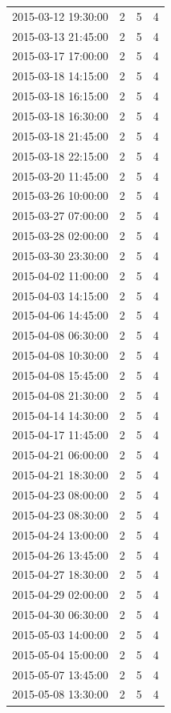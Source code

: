 \begin{tabular}{lrrr}
2015-03-12 19:30:00 & 2 & 5 & 4 \\
2015-03-13 21:45:00 & 2 & 5 & 4 \\
2015-03-17 17:00:00 & 2 & 5 & 4 \\
2015-03-18 14:15:00 & 2 & 5 & 4 \\
2015-03-18 16:15:00 & 2 & 5 & 4 \\
2015-03-18 16:30:00 & 2 & 5 & 4 \\
2015-03-18 21:45:00 & 2 & 5 & 4 \\
2015-03-18 22:15:00 & 2 & 5 & 4 \\
2015-03-20 11:45:00 & 2 & 5 & 4 \\
2015-03-26 10:00:00 & 2 & 5 & 4 \\
2015-03-27 07:00:00 & 2 & 5 & 4 \\
2015-03-28 02:00:00 & 2 & 5 & 4 \\
2015-03-30 23:30:00 & 2 & 5 & 4 \\
2015-04-02 11:00:00 & 2 & 5 & 4 \\
2015-04-03 14:15:00 & 2 & 5 & 4 \\
2015-04-06 14:45:00 & 2 & 5 & 4 \\
2015-04-08 06:30:00 & 2 & 5 & 4 \\
2015-04-08 10:30:00 & 2 & 5 & 4 \\
2015-04-08 15:45:00 & 2 & 5 & 4 \\
2015-04-08 21:30:00 & 2 & 5 & 4 \\
2015-04-14 14:30:00 & 2 & 5 & 4 \\
2015-04-17 11:45:00 & 2 & 5 & 4 \\
2015-04-21 06:00:00 & 2 & 5 & 4 \\
2015-04-21 18:30:00 & 2 & 5 & 4 \\
2015-04-23 08:00:00 & 2 & 5 & 4 \\
2015-04-23 08:30:00 & 2 & 5 & 4 \\
2015-04-24 13:00:00 & 2 & 5 & 4 \\
2015-04-26 13:45:00 & 2 & 5 & 4 \\
2015-04-27 18:30:00 & 2 & 5 & 4 \\
2015-04-29 02:00:00 & 2 & 5 & 4 \\
2015-04-30 06:30:00 & 2 & 5 & 4 \\
2015-05-03 14:00:00 & 2 & 5 & 4 \\
2015-05-04 15:00:00 & 2 & 5 & 4 \\
2015-05-07 13:45:00 & 2 & 5 & 4 \\
2015-05-08 13:30:00 & 2 & 5 & 4 \\

\end{tabular}
